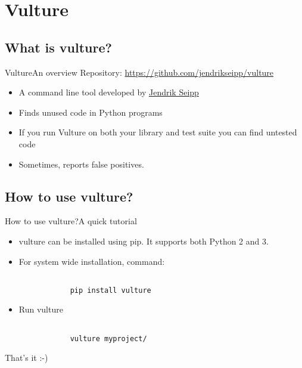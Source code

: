 \documentclass{beamer}
\begin{document}
\section{Vulture}

\subsection{What is vulture?}

\begin{frame}{Vulture}{An overview}
Repository: \url{https://github.com/jendrikseipp/vulture}

\begin{itemize}
    \item
    A command line tool developed by \href{https://github.com/jendrikseipp}{Jendrik Seipp}
        \pause
    \item
    Finds unused code in Python programs
        \pause
    \item
    If you run Vulture on both your library and test suite you can find untested code
        \pause
    \item
    Sometimes, reports false positives.
\end{itemize}
\end{frame}

\subsection{How to use vulture?}

\begin{frame}{How to use vulture?}{A quick tutorial}

\begin{itemize}
    \item{
        vulture can be installed using pip. It supports both Python 2 and 3.
    }
    \pause
    \item{
        For system wide installation, command:
        \begin{verbatim}

            pip install vulture

        \end{verbatim}
        \pause
    }
    \item{
        Run vulture
        \begin{verbatim}

            vulture myproject/

        \end{verbatim}
        \pause
    }
\end{itemize}

That's it :-)
\end{frame}
\end{document}

